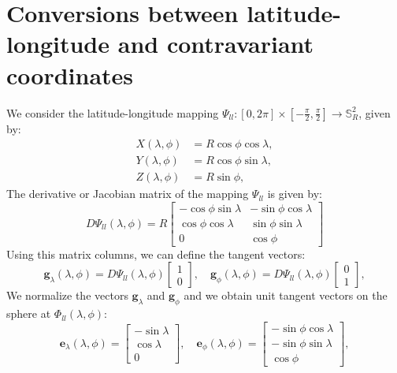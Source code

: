 \section{Conversions between latitude-longitude and contravariant coordinates}
\label{anexo-sph-ll}
We consider the latitude-longitude mapping 
$\Psi_{ll}: [0,2\pi] \times [-\frac{\pi}{2},\frac{\pi}{2}] \to \mathbb{S}^2_R$, given by:
\begin{align}
	\label{ll2sph}
	X(\lambda,\phi) &= R\cos \phi \cos \lambda,\\
	Y(\lambda,\phi) &= R\cos \phi \sin \lambda,\\
	Z(\lambda,\phi) &= R\sin \phi,
\end{align}
The derivative or Jacobian matrix of the mapping $\Psi_{ll}$ is given by:
\begin{equation}
	\label{dpsi}
	D\Psi_{ll} (\lambda,\phi) = 
	R \begin{bmatrix}
		  -\cos \phi \sin \lambda &  -\sin \phi \cos \lambda \\
		   \cos \phi \cos \lambda & \sin \phi \sin \lambda \\
		  0  &  \cos \phi
	\end{bmatrix}
\end{equation}
Using this matrix columns, we can define the tangent vectors:
\begin{equation}
	\boldsymbol{g}_{\lambda}(\lambda,\phi) = D\Psi_{ll}(\lambda,\phi)
	\begin{bmatrix}
		 1 \\
		 0
	\end{bmatrix}, \quad
	\boldsymbol{g}_{\phi}(\lambda,\phi) = D\Psi_{ll}(\lambda,\phi)
	\begin{bmatrix}
		 0 \\
		 1
	\end{bmatrix},
\end{equation}
We normalize the vectors $\boldsymbol{g}_\lambda$ and $\boldsymbol{g}_\phi$
and we obtain unit tangent vectors on the sphere at $\Phi_{ll}(\lambda, \phi)$:
\begin{equation}
	\label{latlon_tg_vectors}
	\boldsymbol{e}_{\lambda}(\lambda,\phi) = 
	\begin{bmatrix}
		 -\sin \lambda \\
		  \cos \lambda \\
		  0
	\end{bmatrix}, \quad
	\boldsymbol{e}_{\phi}(\lambda,\phi) =
	\begin{bmatrix}
		 -\sin \phi \cos \lambda \\
		 -\sin \phi \sin \lambda \\
			  \cos \phi
	\end{bmatrix},
\end{equation}

